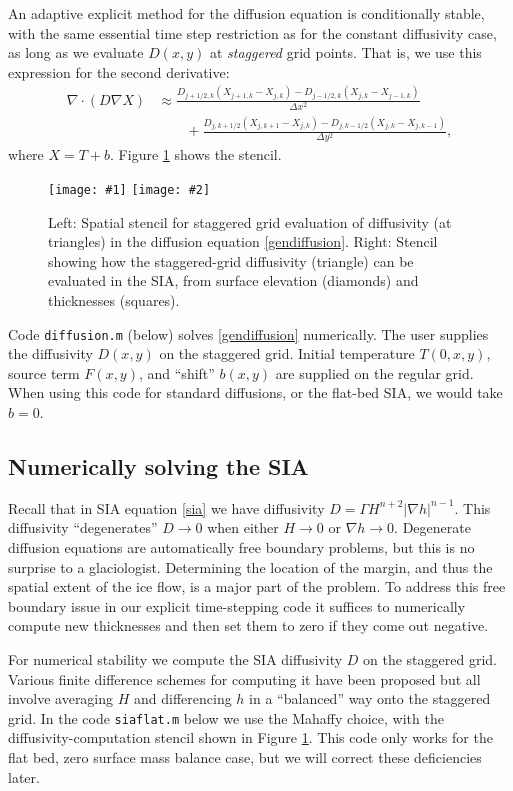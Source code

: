 \documentclass[titlepage,a4paper,final,12pt]{scrartcl}
\newcommand{\grad}{\nabla}
\newcommand{\Div}{\nabla\cdot}
\newcommand{\minput}[1]{
\bigskip
\begin{quote}
\bigskip
\VerbatimInput[frame=single,framesep=3mm,label=\fbox{\normalsize \textsl{\,#1.m\,}},fontfamily=courier,fontsize=\scriptsize]{../mfiles/#1.slim.m}
\bigskip
\end{quote}
}
\newcommand{\twofigsizes}[5]{
\begin{figure}[ht]
\centering
\texttt{[image: \#1]} \quad
\texttt{[image: \#2]}
\caption{#3}
\label{fig:#1}
\end{figure}}
\begin{document}
An adaptive explicit method for the diffusion equation is conditionally stable, with the same essential time step restriction as for the constant diffusivity case, as long as we evaluate $D(x,y)$ at \emph{staggered} grid points.  That is, we use this expression for the second derivative:
\begin{align*}
\Div \left(D \grad X\right) &\approx \frac{D_{j+1/2,k}(X_{j+1,k} - X_{j,k}) - D_{j-1/2,k}(X_{j,k} - X_{j-1,k})}{\Delta x^2} \\
	&\qquad + \frac{D_{j,k+1/2}(X_{j,k+1} - X_{j,k}) - D_{j,k-1/2}(X_{j,k} - X_{j,k-1})}{\Delta y^2},
\end{align*}
where $X=T+b$.  Figure \ref{fig:diffstencil} shows the stencil.

\twofigsizes{diffstencil}{mahaffystencil}{Left:  Spatial stencil for staggered grid evaluation of diffusivity (at triangles) in the diffusion equation \eqref{gendiffusion}.  Right: Stencil showing how the staggered-grid diffusivity (triangle) can be evaluated in the SIA, from surface elevation (diamonds) and thicknesses (squares).}{2.2in}{2.2in}

Code \texttt{diffusion.m} (below) solves \eqref{gendiffusion} numerically.  The user supplies the diffusivity $D(x,y)$ on the staggered grid.  Initial temperature $T(0,x,y)$, source term $F(x,y)$, and ``shift'' $b(x,y)$ are supplied on the regular grid.  When using this code for standard diffusions, or the flat-bed SIA, we would take $b=0$.

\minput{diffusion}


\subsection{Numerically solving the SIA} \label{sec:numericalsia}

Recall that in SIA equation \eqref{sia} we have diffusivity $D = \Gamma H^{n+2} |\grad h|^{n-1}$.  This diffusivity ``degenerates'' $D \to 0$ when either $H\to 0$ or $\grad h \to 0$.  Degenerate diffusion equations are automatically free boundary problems, but this is no surprise to a glaciologist.  Determining the location of the margin, and thus the spatial extent of the ice flow, is a major part of the problem.  To address this free boundary issue in our explicit time-stepping code it suffices to numerically compute new thicknesses and then set them to zero if they come out negative.

For numerical stability we compute the SIA diffusivity $D$ on the staggered grid.  Various finite difference schemes for computing it have been proposed but all involve averaging $H$ and differencing $h$ in a ``balanced'' way onto the staggered grid.  In the code \texttt{siaflat.m} below we use the Mahaffy choice, with the diffusivity-computation stencil shown in Figure \ref{fig:diffstencil}.  This code only works for the flat bed, zero surface mass balance case, but we will correct these deficiencies later.
\end{document}
